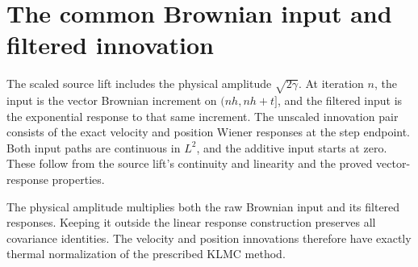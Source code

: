 \documentclass[11pt,a4paper]{article}
\begin{document}
\section{\texorpdfstring{The common Brownian input and filtered innovation}{The common Brownian input and filtered innovation}}


The scaled source lift includes the physical amplitude \(\sqrt{2\gamma}\). At iteration \(n\), the input is the vector Brownian increment on \((nh,nh+t]\), and the filtered input is the exponential response to that same increment. The unscaled innovation pair consists of the exact velocity and position Wiener responses at the step endpoint. Both input paths are continuous in \(L^{2}\), and the additive input starts at zero. These follow from the source lift's continuity and linearity and the proved vector-response properties.



The physical amplitude multiplies both the raw Brownian input and its filtered responses. Keeping it outside the linear response construction preserves all covariance identities. The velocity and position innovations therefore have exactly thermal normalization of the prescribed KLMC method.
\end{document}
